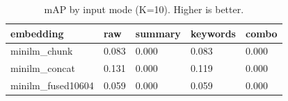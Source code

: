 \begin{table}
\caption{mAP by input mode (K=10). Higher is better.}
\label{tab:map-by-mode}
\begin{tabular}{lllll}
\toprule
embedding & raw & summary & keywords & combo \\
\midrule
minilm_chunk & 0.083 & 0.000 & 0.083 & 0.000 \\
minilm_concat & 0.131 & 0.000 & 0.119 & 0.000 \\
minilm_fused10604 & 0.059 & 0.000 & 0.059 & 0.000 \\
\bottomrule
\end{tabular}
\end{table}
